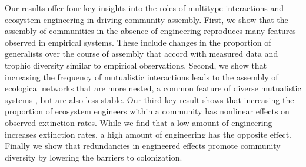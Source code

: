 \documentclass[twocolumn,preprintnumbers,amsmath,amssymb,superscriptaddress,linenumbers]{revtex4-1}
\begin{document}

Our results offer four key insights into the roles of multitype interactions and ecosystem engineering in driving community assembly.
First, we show that the assembly of communities in the absence of engineering reproduces many features observed in empirical systems.
These include changes in the proportion of generalists over the course of assembly that accord with measured data and trophic diversity similar to empirical observations. %
Second, we show that increasing the frequency of mutualistic interactions leads to the assembly of ecological networks that are more nested, a common feature of diverse mutualistic systems \cite{Bascompte2003}, but are also less stable.
Our third key result shows that increasing the proportion of ecosystem engineers within a community has nonlinear effects on observed extinction rates.
While we find that a low amount of engineering increases extinction rates, a high amount of engineering has the opposite effect.
Finally we show that redundancies in engineered effects promote community diversity by lowering the barriers to colonization.\\
\end{document}
